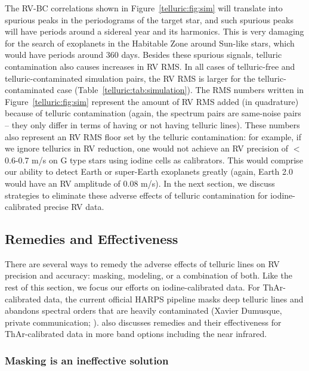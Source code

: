 The RV-BC correlations shown in Figure~\ref{telluric:fig:sim} will
translate into spurious peaks in the periodograms of the target star,
and such spurious peaks will have periods around a sidereal year and
its harmonics. This is very damaging for the search of exoplanets in
the Habitable Zone around Sun-like stars, which would have periods
around 360 days. Besides these spurious signals, telluric
contamination also causes increases in RV RMS. In all cases of
telluric-free and telluric-contaminated simulation pairs, the RV RMS
is larger for the telluric-contaminated case
(Table~\ref{telluric:tab:simulation}). The RMS numbers written in
Figure~\ref{telluric:fig:sim} represent the amount of RV RMS added (in
quadrature) because of telluric contamination (again, the spectrum
pairs are same-noise pairs -- they only differ in terms of having or
not having telluric lines). These numbers also represent an RV RMS
floor set by the telluric contamination: for example, if we ignore
tellurics in RV reduction, one would not achieve an RV precision of
$<$0.6-0.7 m/s on G type stars using iodine cells as calibrators. This
would comprise our ability to detect Earth or super-Earth exoplanets
greatly (again, Earth 2.0 would have an RV amplitude of 0.08 m/s). In
the next section, we discuss strategies to eliminate these adverse
effects of telluric contamination for iodine-calibrated precise RV
data.


\subsection{Remedies and Effectiveness}\label{keck:telluric:remedies}

There are several ways to remedy the adverse effects of telluric lines
on RV precision and accuracy: masking, modeling, or a combination of
both. Like the rest of this section, we focus our efforts on
iodine-calibrated data. For ThAr-calibrated data, the current official
HARPS pipeline masks deep telluric lines and abandons spectral orders
that are heavily contaminated (Xavier Dumusque, private communication;
\citealt{artigau2014}). \cite{2016AAS...22713719S} also discusses
remedies and their effectiveness for ThAr-calibrated data in more band
options including the near infrared.

\subsubsection{Masking is an ineffective solution}\label{keck:telluric:masking}

